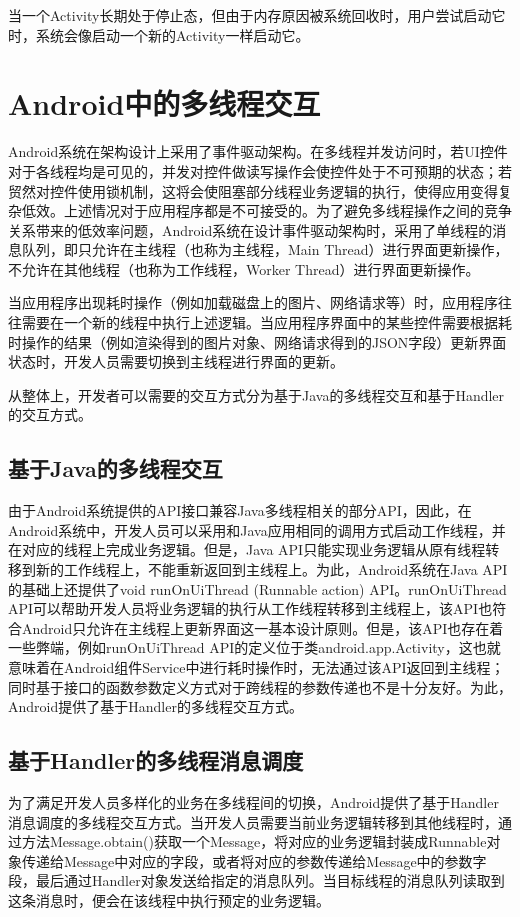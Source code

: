 当一个Activity长期处于停止态，但由于内存原因被系统回收时，用户尝试启动它时，系统会像启动一个新的Activity一样启动它。

\section{Android中的多线程交互}
 Android系统在架构设计上采用了事件驱动架构。在多线程并发访问时，若UI控件对于各线程均是可见的，并发对控件做读写操作会使控件处于不可预期的状态；若贸然对控件使用锁机制，这将会使阻塞部分线程业务逻辑的执行，使得应用变得复杂低效。上述情况对于应用程序都是不可接受的。为了避免多线程操作之间的竞争关系带来的低效率问题，Android系统在设计事件驱动架构时，采用了单线程的消息队列，即只允许在主线程（也称为主线程，Main Thread）进行界面更新操作，不允许在其他线程（也称为工作线程，Worker Thread）进行界面更新操作。

当应用程序出现耗时操作（例如加载磁盘上的图片、网络请求等）时，应用程序往往需要在一个新的线程中执行上述逻辑。当应用程序界面中的某些控件需要根据耗时操作的结果（例如渲染得到的图片对象、网络请求得到的JSON字段）更新界面状态时，开发人员需要切换到主线程进行界面的更新。

从整体上，开发者可以需要的交互方式分为基于Java的多线程交互和基于Handler的交互方式。

\subsection{基于Java的多线程交互}

由于Android系统提供的API接口兼容Java多线程相关的部分API，因此，在Android系统中，开发人员可以采用和Java应用相同的调用方式启动工作线程，并在对应的线程上完成业务逻辑。但是，Java API只能实现业务逻辑从原有线程转移到新的工作线程上，不能重新返回到主线程上。为此，Android系统在Java API的基础上还提供了void runOnUiThread (Runnable action) API。runOnUiThread API可以帮助开发人员将业务逻辑的执行从工作线程转移到主线程上，该API也符合Android只允许在主线程上更新界面这一基本设计原则。但是，该API也存在着一些弊端，例如runOnUiThread API的定义位于类android.app.Activity，这也就意味着在Android组件Service中进行耗时操作时，无法通过该API返回到主线程；同时基于接口的函数参数定义方式对于跨线程的参数传递也不是十分友好。为此，Android提供了基于Handler的多线程交互方式。

\subsection{基于Handler的多线程消息调度}

为了满足开发人员多样化的业务在多线程间的切换，Android提供了基于Handler消息调度的多线程交互方式。当开发人员需要当前业务逻辑转移到其他线程时，通过方法Message.obtain()获取一个Message，将对应的业务逻辑封装成Runnable对象传递给Message中对应的字段，或者将对应的参数传递给Message中的参数字段，最后通过Handler对象发送给指定的消息队列。当目标线程的消息队列读取到这条消息时，便会在该线程中执行预定的业务逻辑。

